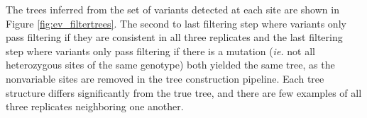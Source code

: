 \documentclass{article}
\begin{document}
\begin{outline}
	\item The trees inferred from the set of variants detected at each site are shown in Figure \ref{fig:ev_filtertrees}. The second to last filtering step where variants only pass filtering if they are consistent in all three replicates and the last filtering step where variants only pass filtering if there is a mutation (\textit{ie.} not all heterozygous sites of the same genotype) both yielded the same tree, as the nonvariable sites are removed in the tree construction pipeline. Each tree structure differs significantly from the true tree, and there are few examples of all three replicates neighboring one another.

\end{outline}
\end{document}
